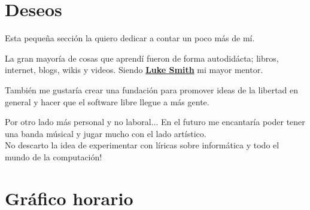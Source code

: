 \documentclass[%
               doublesided,
               paper=a4,
               fontsize=10pt
              ]{my-resume}
\begin{document}
{    \section{Deseos}
    Esta pequeña sección la quiero dedicar a contar un poco más de mí.

    \medskip
    La gran mayoría de cosas que aprendí fueron de forma autodidácta; libros, internet, blogs, wikis y videos. 
    Siendo \textbf{\href{https://lukesmith.xyz/}{Luke Smith}} mi mayor mentor.

    \medskip
    También me gustaría crear una fundación para promover ideas de la libertad en general y hacer que el software libre llegue a más gente.

    \medskip
    Por otro lado más personal y no laboral... En el futuro me encantaría poder tener una banda músical y jugar mucho con el lado artístico.\\
    No descarto la idea de experimentar con líricas sobre informática y todo el mundo de la computación!

    \section{Gráfico horario}
}
\makebody
\end{document}
